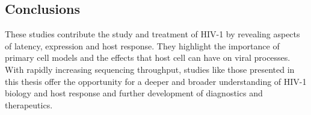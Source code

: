 \documentclass[../sherrill-Mix_thesis.tex]{subfiles}
\begin{document}
\subsection{Conclusions}
	These studies contribute the study and treatment of HIV-1 by revealing aspects of latency, expression and host response. They highlight the importance of primary cell models and the effects that host cell can have on viral processes. With rapidly increasing sequencing throughput, studies like those presented in this thesis offer the opportunity for a deeper and broader understanding of HIV-1 biology and host response and further development of diagnostics and therapeutics.
\end{document}
